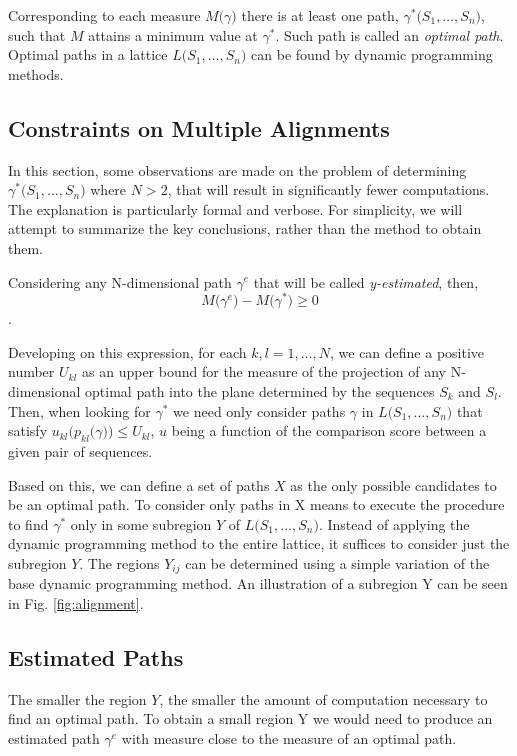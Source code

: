 \documentclass[11pt]{article}
\begin{document}
Corresponding to each measure $M\big(\gamma\big)$ there is at least one path, $\gamma^*\big(S_1, \dots, S_n\big)$, such that $M$ attains a minimum value at $\gamma^*$. Such path is called an \textit{optimal path}. Optimal paths in a lattice $L\big(S_1, \dots, S_n\big)$ can be found by dynamic programming methods.

\subsection{Constraints on Multiple Alignments}

In this section, some observations are made on the problem of determining $\gamma^*\big(S_1,\dots,S_n\big)$ where $N > 2$, that will result in significantly fewer computations. The explanation is particularly formal and verbose. For simplicity, we will attempt to summarize the key conclusions, rather than the method to obtain them.

Considering any N-dimensional path $\gamma^e$ that will be called \textit{y-estimated}, then, $$M\big(\gamma^e\big) - M\big(\gamma^*\big) \geq 0$$.

Developing on this expression, for each $k,l = 1,\dots, N$, we can define a positive number $U_{kl}$ as an upper bound for the measure of the projection of any N-dimensional optimal path into the plane determined by the sequences $S_k$ and $S_l$. Then, when looking for $\gamma^*$ we need only consider paths $\gamma$ in $L\big(S_1, \dots, S_n\big)$ that satisfy $u_{kl}\big(p_{kl}\big(\gamma\big)\big) \leq U_{kl}$, $u$ being a function of the comparison score between a given pair of sequences. 

Based on this, we can define a set of paths $X$ as the only possible candidates to be an optimal path. To consider only paths in X means to execute the procedure to find $\gamma^*$ only in some subregion $Y$ of $L(S_1,\dots,S_n\big)$. Instead of applying the dynamic programming method to the entire lattice, it suffices to consider just the subregion $Y$. The regions $Y_{ij}$ can be determined using a simple variation of the base dynamic programming method. An illustration of a subregion Y can be seen in Fig. \ref{fig:alignment}.

\subsection{Estimated Paths}

The smaller the region $Y$, the smaller the amount of computation necessary to find an optimal path. To obtain a small region Y we would need to produce an estimated path $\gamma^e$ with measure close to the measure of an optimal path. 
\end{document}
